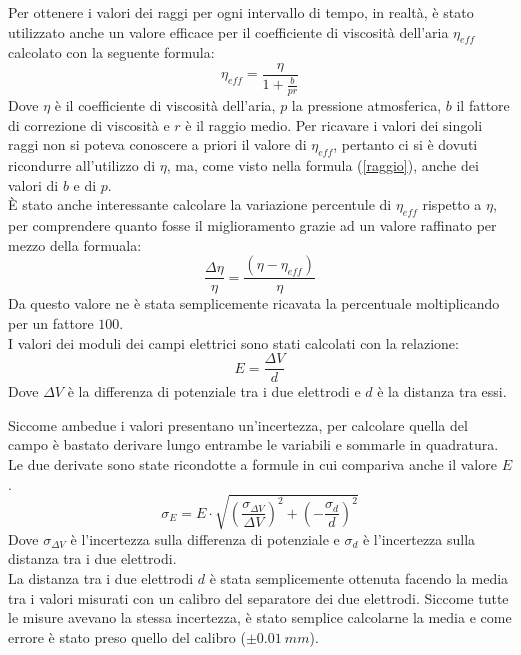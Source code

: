 \documentclass{article}
\begin{document}
Per ottenere i valori dei raggi per ogni intervallo di tempo, in realtà, è stato utilizzato anche un valore efficace per il coefficiente di viscosità dell'aria $\eta_{eff}$ calcolato con la seguente formula:
\begin{equation}
	\eta_{eff}=\frac{\eta}{1+\frac b{pr}}
\end{equation}
Dove $\eta$ è il coefficiente di viscosità dell'aria, $p$ la pressione atmosferica, $b$ il fattore di correzione di viscosità e $r$ è il raggio medio. Per ricavare i valori dei singoli raggi non si poteva conoscere a priori il valore di $\eta_{eff}$, pertanto ci si è dovuti ricondurre all'utilizzo di $\eta$, ma, come visto nella formula (\ref{raggio}), anche dei valori di $b$ e di $p$.\\

È stato anche interessante calcolare la variazione percentule di $\eta_{eff}$ rispetto a $\eta$, per comprendere quanto fosse il miglioramento grazie ad un valore raffinato per mezzo della formuala:
\begin{equation}
	\frac{\Delta \eta}{\eta}=\frac{(\eta-\eta_{eff})}{\eta}
\end{equation}
Da questo valore ne è stata semplicemente ricavata la percentuale moltiplicando per un fattore $100$.\\

I valori dei moduli dei campi elettrici sono stati calcolati con la relazione:
\begin{equation}
	E=\frac{\Delta V}{d}
\end{equation}
Dove $\Delta V$ è la differenza di potenziale tra i due elettrodi e $d$ è la distanza tra essi.

Siccome ambedue i valori presentano un'incertezza, per calcolare quella del campo è bastato derivare lungo entrambe le variabili e sommarle in quadratura. Le due derivate sono state ricondotte a formule in cui compariva anche il valore $E$.
\begin{equation}
	\sigma_{E}=E\cdot\sqrt{\left(\frac{\sigma_{\Delta V}}{\Delta V}\right)^2+\left(-\frac{\sigma_d}{d}\right)^2}
\end{equation}
Dove $\sigma_{\Delta V}$ è l'incertezza sulla differenza di potenziale e $\sigma_d$ è l'incertezza sulla distanza tra i due elettrodi.\\

La distanza tra i due elettrodi $d$ è stata semplicemente ottenuta facendo la media tra i valori misurati con un calibro del separatore dei due elettrodi. Siccome tutte le misure avevano la stessa incertezza, è stato semplice calcolarne la media e come errore è stato preso quello del calibro ($\pm 0.01\ mm$).\\
\end{document}
